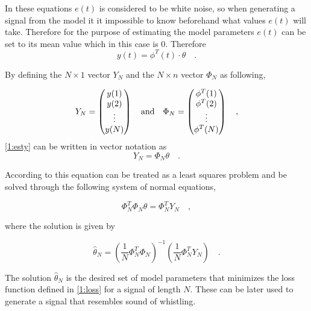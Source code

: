 \documentclass{IEEEtran}
\begin{document}
In these equations $e(t)$ is considered to be white noise, so when
generating a signal from the model it it impossible to know beforehand
what values $e(t)$ will take. Therefore for the purpose of estimating
the model parameters $e(t)$ can be set to its mean value which in this
case is $0$. Therefore
\begin{equation}
  \label{1:esty}
  y(t) = \phi^T(t)\cdot\theta \quad .
\end{equation}

By defining the $N\times1$ vector $Y_N$ and the $N\times n$ vector
$\Phi_N$ as following,

\begin{equation*}
  Y_N =
  \begin{pmatrix}
    y(1) \\ y(2) \\ \vdots \\ y(N)
  \end{pmatrix}
  \quad
  \textnormal{and}
  \quad
  \Phi_N =
  \begin{pmatrix}
    \phi^T(1) \\ \phi^T(2) \\ \vdots \\ \phi^T(N)
  \end{pmatrix}
  \quad ,
\end{equation*}
\eqref{1:esty} can be written in vector notation as
\begin{equation*}
  Y_N = \Phi_N\theta \quad .
\end{equation*}

According to \cite{signalproc} this equation can be treated as a least
squares problem and be solved through the following system of normal
equations,

\begin{equation*}
  \Phi_N^T\Phi_N\theta = \Phi_N^T Y_N \quad ,
\end{equation*}

where the solution is given by

\begin{equation*}
  \hat{\theta}_N = \left( \frac{1}{N}\Phi_N^T\Phi_N \right)^{-1}
                   \left( \frac{1}{N}\Phi_N^T Y_N \right)
  \quad .
\end{equation*}

The solution $\hat{\theta}_N$ is the desired set of model parameters
that minimizes the loss function defined in \ref{1:loss} for a signal
of length $N$. These can be later used to generate a signal that
resembles sound of whistling.
\end{document}
